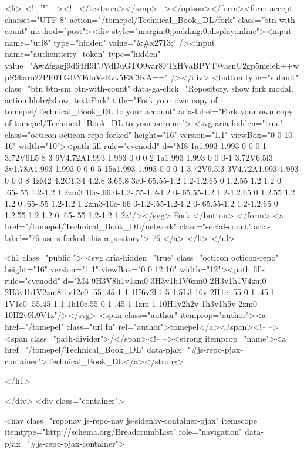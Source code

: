   <li>
          <!-- '"` --><!-- </textarea></xmp> --></option></form><form accept-charset="UTF-8" action="/tomepel/Technical_Book_DL/fork" class="btn-with-count" method="post"><div style="margin:0;padding:0;display:inline"><input name="utf8" type="hidden" value="&#x2713;" /><input name="authenticity_token" type="hidden" value="AwZfgagj9d64H9FJVdDuGTO9var8FTgHVaBPYTWasnU2gp5meieh++wpF9karo22PF0TGBYFdoVeRvk5E8f3KA==" /></div>
            <button
                type="submit"
                class="btn btn-sm btn-with-count"
                data-ga-click="Repository, show fork modal, action:blob#show; text:Fork"
                title="Fork your own copy of tomepel/Technical_Book_DL to your account"
                aria-label="Fork your own copy of tomepel/Technical_Book_DL to your account">
              <svg aria-hidden="true" class="octicon octicon-repo-forked" height="16" version="1.1" viewBox="0 0 10 16" width="10"><path fill-rule="evenodd" d="M8 1a1.993 1.993 0 0 0-1 3.72V6L5 8 3 6V4.72A1.993 1.993 0 0 0 2 1a1.993 1.993 0 0 0-1 3.72V6.5l3 3v1.78A1.993 1.993 0 0 0 5 15a1.993 1.993 0 0 0 1-3.72V9.5l3-3V4.72A1.993 1.993 0 0 0 8 1zM2 4.2C1.34 4.2.8 3.65.8 3c0-.65.55-1.2 1.2-1.2.65 0 1.2.55 1.2 1.2 0 .65-.55 1.2-1.2 1.2zm3 10c-.66 0-1.2-.55-1.2-1.2 0-.65.55-1.2 1.2-1.2.65 0 1.2.55 1.2 1.2 0 .65-.55 1.2-1.2 1.2zm3-10c-.66 0-1.2-.55-1.2-1.2 0-.65.55-1.2 1.2-1.2.65 0 1.2.55 1.2 1.2 0 .65-.55 1.2-1.2 1.2z"/></svg>
              Fork
            </button>
</form>
    <a href="/tomepel/Technical_Book_DL/network" class="social-count"
       aria-label="76 users forked this repository">
      76
    </a>
  </li>
</ul>

        <h1 class="public ">
  <svg aria-hidden="true" class="octicon octicon-repo" height="16" version="1.1" viewBox="0 0 12 16" width="12"><path fill-rule="evenodd" d="M4 9H3V8h1v1zm0-3H3v1h1V6zm0-2H3v1h1V4zm0-2H3v1h1V2zm8-1v12c0 .55-.45 1-1 1H6v2l-1.5-1.5L3 16v-2H1c-.55 0-1-.45-1-1V1c0-.55.45-1 1-1h10c.55 0 1 .45 1 1zm-1 10H1v2h2v-1h3v1h5v-2zm0-10H2v9h9V1z"/></svg>
  <span class="author" itemprop="author"><a href="/tomepel" class="url fn" rel="author">tomepel</a></span><!--
--><span class="path-divider">/</span><!--
--><strong itemprop="name"><a href="/tomepel/Technical_Book_DL" data-pjax="#js-repo-pjax-container">Technical_Book_DL</a></strong>

</h1>

      </div>
      <div class="container">
        
<nav class="reponav js-repo-nav js-sidenav-container-pjax"
     itemscope
     itemtype="http://schema.org/BreadcrumbList"
     role="navigation"
     data-pjax="#js-repo-pjax-container">

